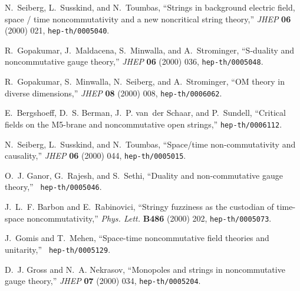 \documentclass[a4paper,twoside,titlepage,12pt]{article}
\begin{document}


%
%

\providecommand{\href}[2]{#2}\begingroup\raggedright\begin{thebibliography}{10}
N.~Seiberg, L.~Susskind, and N.~Toumbas, ``Strings in background electric
  field, space / time noncommutativity and a new noncritical string theory,''
  {\em JHEP} {\bf 06} (2000) 021,
  \href{http://xxx.lanl.gov/abs/hep-th/0005040}{{\tt hep-th/0005040}}.

R.~Gopakumar, J.~Maldacena, S.~Minwalla, and A.~Strominger, ``S-duality and
  noncommutative gauge theory,'' {\em JHEP} {\bf 06} (2000) 036,
  \href{http://xxx.lanl.gov/abs/hep-th/0005048}{{\tt hep-th/0005048}}.

R.~Gopakumar, S.~Minwalla, N.~Seiberg, and A.~Strominger, ``{OM} theory in
  diverse dimensions,'' {\em JHEP} {\bf 08} (2000) 008,
  \href{http://xxx.lanl.gov/abs/hep-th/0006062}{{\tt hep-th/0006062}}.

E.~Bergshoeff, D.~S. Berman, J.~P. van~der Schaar, and P.~Sundell, ``Critical
  fields on the {M5}-brane and noncommutative open strings,''
  \href{http://xxx.lanl.gov/abs/hep-th/0006112}{{\tt hep-th/0006112}}.

N.~Seiberg, L.~Susskind, and N.~Toumbas, ``Space/time non-commutativity and
  causality,'' {\em JHEP} {\bf 06} (2000) 044,
  \href{http://xxx.lanl.gov/abs/hep-th/0005015}{{\tt hep-th/0005015}}.

O.~J. Ganor, G.~Rajesh, and S.~Sethi, ``Duality and non-commutative gauge
  theory,'' \href{http://xxx.lanl.gov/abs/hep-th/0005046}{{\tt
  hep-th/0005046}}.

J.~L.~F. Barbon and E.~Rabinovici, ``Stringy fuzziness as the custodian of
  time-space noncommutativity,'' {\em Phys. Lett.} {\bf B486} (2000) 202,
  \href{http://xxx.lanl.gov/abs/hep-th/0005073}{{\tt hep-th/0005073}}.

J.~Gomis and T.~Mehen, ``Space-time noncommutative field theories and
  unitarity,'' \href{http://xxx.lanl.gov/abs/hep-th/0005129}{{\tt
  hep-th/0005129}}.

D.~J. Gross and N.~A. Nekrasov, ``Monopoles and strings in noncommutative gauge
  theory,'' {\em JHEP} {\bf 07} (2000) 034,
  \href{http://xxx.lanl.gov/abs/hep-th/0005204}{{\tt hep-th/0005204}}.


\end{thebibliography}
\end{document}
